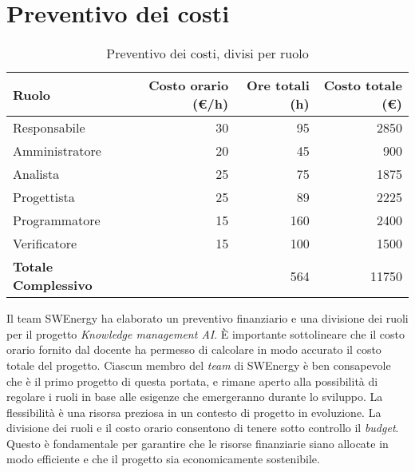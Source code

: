 \section{Preventivo dei costi}

\begin{table}[H]
	\renewcommand{\arraystretch}{1.5}
	\centering
	\begin{tabular}{l|r|r|r}
		\textbf{Ruolo} & \textbf{Costo orario (€/h)} & \textbf{Ore totali (h)} & 
		\textbf{Costo totale (€)} \\
		\hline
		Responsabile				&	 30 &  95 &	 2850			\\
		Amministratore				&	 20 &  45 &   900  			\\
		Analista					&	 25 &  75 &  1875			\\
		Progettista					&	 25 &  89 &  2225			\\
		Programmatore				&	 15 & 160 &  2400			\\
		Verificatore				&	 15 & 100 &  1500			\\
		\hline
		\textbf{Totale Complessivo} &		& 564 &	11750			\\
	\end{tabular}
	\caption{Preventivo dei costi, divisi per ruolo}

\end{table}

Il team SWEnergy ha elaborato un preventivo finanziario e una divisione dei
ruoli per il progetto \textit{Knowledge management AI}. È importante 
sottolineare che il costo orario fornito dal docente ha permesso di calcolare 
in modo accurato il costo totale del progetto. 
Ciascun membro del \textit{team} di SWEnergy è ben consapevole che è il primo
progetto di questa portata, e 
rimane aperto alla possibilità di regolare i ruoli in base alle esigenze che 
emergeranno durante lo sviluppo. La flessibilità è una risorsa preziosa in un 
contesto di progetto in evoluzione.
La divisione dei ruoli e il costo orario consentono di tenere sotto controllo il
\textit{budget}. Questo è fondamentale per garantire che le risorse finanziarie siano 
allocate in modo efficiente e che il progetto sia economicamente sostenibile.
